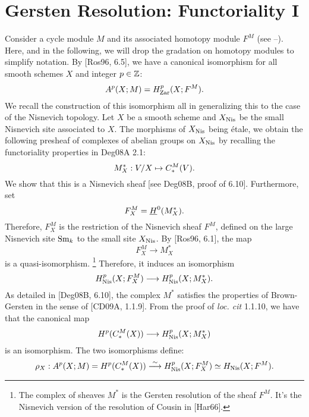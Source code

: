 \section{Gersten Resolution: Functoriality I}

Consider a cycle module $M$ and its associated homotopy module 
$F^M$ (see --). Here, and in the following, we will drop the 
gradation on homotopy modules to simplify notation. By 
[Ros96, 6.5], we have a canonical isomorphism for all smooth 
schemes $X$ and integer $p \in \mathbb{Z}$:
\[
A^p(X; M) = H_{\mathrm{Zar}}^p(X; F^M).
\]
We recall the construction of this isomorphism all in generalizing
this to the case of the Nisnevich topology. Let $X$ be a smooth 
scheme and $X_{\mathrm{Nis}}$ be the small Nisnevich site associated to 
$X$. The morphisms of $X_{\mathrm{Nis}}$ being \'etale, we obtain the 
following presheaf of complexes of abelian groups on $X_{\mathrm{Nis}}$ 
by recalling the functoriality properties in Deg08A 2.1:
\[
M^*_X: V/X \mapsto C_*^{M}(V).
\]
We show that this is a Nisnevich sheaf [see Deg08B, proof of 6.10].
Furthermore, set
\[
F^M_X = \underline{H}^0(M^*_X).
\]
Therefore, $F^M_X$ is the restriction of the Nisnevich sheaf $F^M$,
defined on the large Nisnevich site $\mathrm{Sm}_{k}$ to the small site
$X_{\mathrm{Nis}}$. By [Ros96, 6.1], the map
\[
F^M_X \to M^*_X
\]
is a quasi-isomorphism. \footnote{The complex of sheaves $M^*$ is 
the Gersten resolution of the sheaf $F^M$. It's the Nisnevich 
version of the resolution of Cousin in [Har66].} Therefore, it 
induces an isomorphism
\[
H_{\mathrm{Nis}}^p(X; F^M_X) \longrightarrow H_{\mathrm{Nis}}^p(X; M^*_X).
\]
As detailed in [Deg08B, 6.10], the complex $M^*$ satisfies the
properties of Brown-Gersten in the sense of [CD09A, 1.1.9]. From 
the proof of \emph{loc. cit} 1.1.10, we have that the canonical
map
\[
H^p(C_*^{M}(X)) \longrightarrow H_{\mathrm{Nis}}^p(X; M^*_X)
\]
is an isomorphism. The two isomorphisms define:
\begin{equation}\label{eq_cm_hnis_equiv}
\rho_X: A^p(X; M) = H^p(C_*^{M}(X)) \stackrel{\sim}{\longrightarrow}
   H_{\mathrm{Nis}}^p(X; F^M_X) \simeq H_{\mathrm{Nis}}(X; F^M).
\end{equation}

